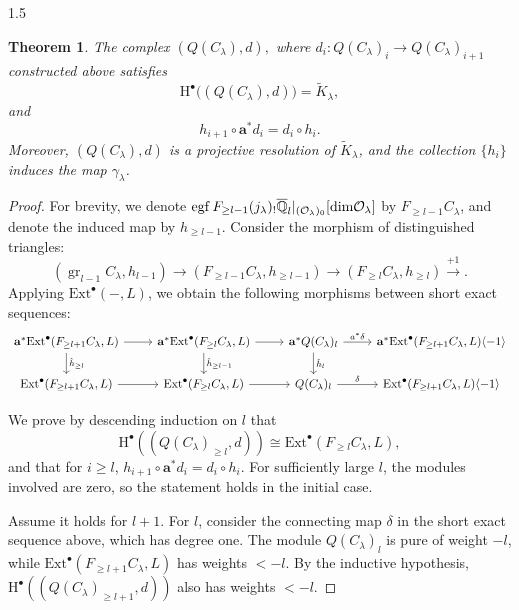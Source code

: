 \documentclass[10pt]{amsart}
\newtheorem{theorem}{Theorem}[section]
\def\dim{\mbox{\rm dim}}   \def\End{\mbox{\rm End}}
\begin{document}
\begin{spacing}{1.5}
\begin{theorem}
The complex $(Q(C_{\lambda}), d),$ where $d_i : Q(C_{\lambda})_i \to Q(C_{\lambda})_{i+1}$ constructed above satisfies
\[
\mathrm{H}^{\bullet}\bigl((Q(C_{\lambda}), d)\bigr) = \widetilde{K}_{\lambda},
\]
and
\[
h_{i+1} \circ \mathbf{a}^* d_i = d_i \circ h_i.
\]
Moreover, $(Q(C_{\lambda}), d)$ is a projective resolution of $\widetilde{K}_{\lambda}$, and the collection $\{h_i\}$ induces the map $\gamma_{\lambda}$.
\end{theorem}
\begin{proof}
For brevity, we denote $\operatorname{egf} F_{\geq l-1} (j_{\lambda})_! \overline{\mathbb{Q}}_l |_{(\mathcal{O}_{\lambda})_0} [\dim \mathcal{O}_{\lambda}]$ by $F_{\geq l-1} C_{\lambda}$, and denote the induced map by $h_{\geq l-1}$.
Consider the morphism of distinguished triangles:
\[
(\operatorname{gr}_{l-1}C_{\lambda},h_{l-1}) \to 
(F_{\geq l-1} C_{\lambda}, h_{\geq l-1}) \to 
(F_{\geq l} C_{\lambda}, h_{\geq l}) \xrightarrow{+1}.
\]
Applying $\mathrm{Ext}^{\bullet}(-, L)$, we obtain the following morphisms between short exact sequences:
\[
\begin{tikzcd}
\mathbf{a}^* \mathrm{Ext}^{\bullet}(F_{\geq l+1} C_{\lambda}, L) \arrow[d, "\hat{h}_{\geq l}"] \arrow[r] &
\mathbf{a}^* \mathrm{Ext}^{\bullet}(F_{\geq l} C_{\lambda}, L) \arrow[d, "\hat{h}_{\geq l-1}"] \arrow[r] &
\mathbf{a}^* Q(C_{\lambda})_l \arrow[d, "\hat{h}_l"] \arrow[r, "a^* \delta"] &
\mathbf{a}^* \mathrm{Ext}^{\bullet}(F_{\geq l+1} C_{\lambda}, L) \langle -1 \rangle \\
\mathrm{Ext}^{\bullet}(F_{\geq l+1} C_{\lambda}, L) \arrow[r] &
\mathrm{Ext}^{\bullet}(F_{\geq l} C_{\lambda}, L) \arrow[r] &
Q(C_{\lambda})_l \arrow[r, "\delta"] &
\mathrm{Ext}^{\bullet}(F_{\geq l+1} C_{\lambda}, L) \langle -1 \rangle
\end{tikzcd}
\]

We prove by descending induction on $l$ that
\[
\mathrm{H}^{\bullet}((Q(C_{\lambda})_{\geq l}, d)) \cong \mathrm{Ext}^{\bullet}(F_{\geq l} C_{\lambda}, L),
\]
and that for $i \geq l$, $h_{i+1} \circ \mathbf{a}^* d_i = d_i \circ h_i$. For sufficiently large $l$, the modules involved are zero, so the statement holds in the initial case.

Assume it holds for $l+1$. For $l$, consider the connecting map $\delta$ in the short exact sequence above, which has degree one. The module $Q(C_{\lambda})_l$ is pure of weight $-l$, while $\mathrm{Ext}^{\bullet}(F_{\geq l+1} C_{\lambda}, L)$ has weights $< -l$. By the inductive hypothesis, $\mathrm{H}^{\bullet}((Q(C_{\lambda})_{\geq l+1}, d))$ also has weights $< -l$.


\end{proof}
\end{spacing}
\end{document}

